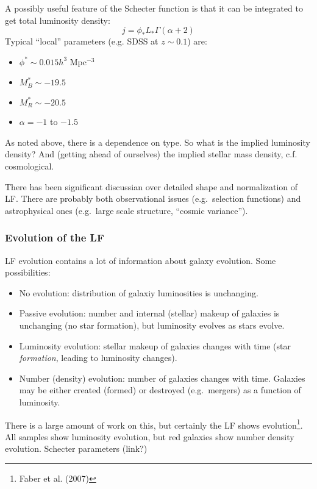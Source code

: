 \documentclass{article}
\newcommand{\mynotes}[1]{\textcolor{cadmiumorange}{#1}}
\begin{document}
A possibly useful feature of the Schecter function is that it can be
integrated to get total luminosity density:
\[
    j = \phi_{*}L_{*}\Gamma\left(\alpha + 2\right)
\]
Typical ``local'' parameters (e.g. SDSS at $z\sim0.1$) are:
\begin{itemize}
    \item $\phi^{*}\sim0.015h^{3}$ Mpc$^{-3}$
    \item $M_{B}^{*}\sim-19.5$
    \item $M_{R}^{*}\sim-20.5$
    \item $\alpha=-1$ to $-1.5$
\end{itemize}
As noted above, there is a dependence on type. So what is the implied
luminosity density? And (getting ahead of ourselves) the implied stellar
mass density, c.f. cosmological.

There has been significant discussian over detailed shape and normalization of
LF\@.  There are probably both observational issues (e.g.\ selection functions)
and astrophysical ones (e.g.\ large scale structure, ``cosmic variance'').

\subsubsection{Evolution of the LF}
LF evolution contains a lot of information about galaxy evolution.
Some possibilities:
\begin{itemize}
    \item No evolution: distribution of galaxiy luminosities is unchanging.
    \item Passive evolution: number and internal (stellar) makeup of
        galaxies is unchanging \mynotes{(no star formation)},
        but luminosity evolves as stars evolve.
    \item Luminosity evolution: stellar makeup of galaxies changes with
        time (star \emph{formation}, leading to luminosity changes).
    \item Number (density) evolution: number of galaxies changes with time.
        Galaxies may be either created (formed) or destroyed (e.g.\
        mergers) as a function of luminosity.
\end{itemize}
There is a large amount of work on this, but certainly the LF shows
evolution\footnote{Faber et al. (2007)}. All samples show luminosity
evolution, but red galaxies show number density evolution.
Schecter parameters (link?)
\end{document}
